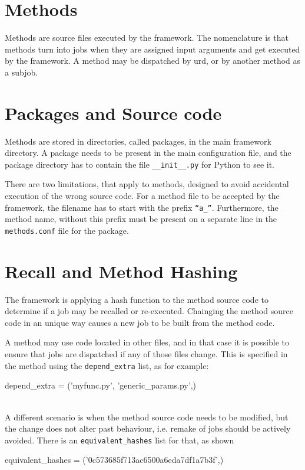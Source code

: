 \section{Methods}

Methods are source files executed by the framework.  The nomenclature
is that methods turn into jobs when they are assigned input arguments
and get executed by the framework.  A method may be dispatched by urd,
or by another method as a subjob.



\section{Packages and Source code}

Methods are stored in directories, called packages, in the main
framework directory.  A package needs to be present in the main
configuration file, and the package directory has to contain the file
\texttt{\_\_init\_\_.py} for Python to see it.

There are two limitations, that apply to methods, designed to avoid
accidental execution of the wrong source code.  For a method file to
be accepted by the framework, the filename has to start with the
prefix \texttt{``a\_''}.  Furthermore, the method name, without this
prefix must be present on a separate line in the \texttt{methods.conf}
file for the package.



\section{Recall and Method Hashing}

The framework is applying a hash function to the method source code to
determine if a job may be recalled or re-executed.  Chainging the
method source code in an unique way causes a new job to be built from
the method code.

A method may use code located in other files, and in that case it is
possible to ensure that jobs are dispatched if any of those files
change.  This is specified in the method using the
\texttt{depend\_extra} list, as for example:
\\
\begin{python}
depend_extra = ('myfunc.py', 'generic_params.py',)
\end{python}
\\
A different scenario is when the method source code needs to be
modified, but the change does not alter past behaviour, i.e. remake of
jobs should be actively avoided.  There is an
\texttt{equivalent\_hashes} list for that, as shown
\\
\begin{python}
  equivalent_hashes = ('0c573685f713ac6500a6eda7df1a7b3f',)
\end{python}





